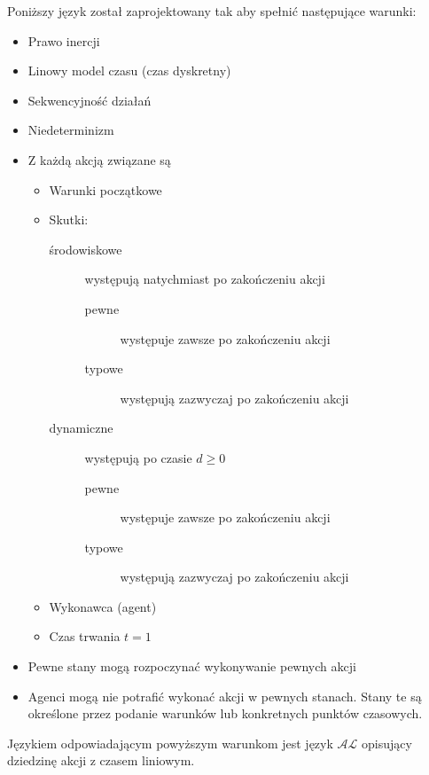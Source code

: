 Poniższy język został zaprojektowany tak aby spełnić następujące warunki:
\begin{itemize}
	\item Prawo inercji
	\item Linowy model czasu (czas dyskretny)
	\item Sekwencyjność działań
	\item Niedeterminizm
	\item Z każdą akcją związane są
		\begin{itemize}
			\item Warunki początkowe
			\item Skutki:
				\begin{description}
					\item[środowiskowe] występują natychmiast po zakończeniu akcji
						\begin{description}
							\item[pewne] występuje zawsze po zakończeniu akcji
							\item[typowe] występują zazwyczaj po zakończeniu akcji
						\end{description}
					\item[dynamiczne] występują po czasie $d \geqslant 0$
						\begin{description}
							\item[pewne] występuje zawsze po zakończeniu akcji
							\item[typowe] występują zazwyczaj po zakończeniu akcji
						\end{description}
				\end{description}
			\item Wykonawca (agent)
			\item Czas trwania $t = 1$
		\end{itemize}
	\item Pewne stany mogą rozpoczynać wykonywanie pewnych akcji
	\item Agenci mogą nie potrafić wykonać akcji w pewnych stanach. Stany te są określone przez podanie
	warunków lub konkretnych punktów czasowych.
\end{itemize}
Językiem odpowiadającym powyższym warunkom jest język $\mathcal{AL}$
opisujący dziedzinę akcji z czasem liniowym.

